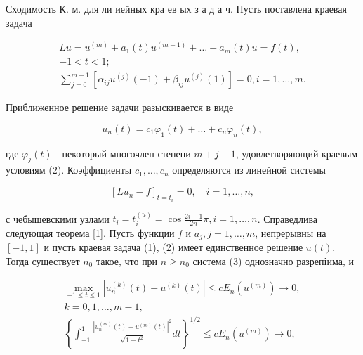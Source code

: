 \documentclass[10pt]{article}
\begin{document}
Сходимость К. м. для ли иейных кра ев ых з а д а ч. Пусть поставлена краевая задача



\[

\begin{gathered}

L u=u^{(m)}+a_{1}(t) u^{(m-1)}+\ldots+a_{m}(t) u=f(t), \\

-1<t<1 ; \\

\sum_{j=0}^{m-1}\left[\alpha_{i j} u^{(j)}(-1)+\beta_{i j} u^{(j)}(1)\right]=0, i=1, \ldots, m .

\end{gathered}

\]



Приближенное решение задачи разыскивается в виде



\[

u_{n}(t)=c_{1} \varphi_{1}(t)+\ldots+c_{n} \varphi_{n}(t),

\]



где $\varphi_{j}(t)$ - некоторый многочлен степени $m+j-1$, удовлетворяющий краевым условиям (2). Коэффициенты $c_{1}, \ldots, c_{n}$ определяются из линейной системы



\[

\left[L u_{n}-f\right]_{t=t_{i}}=0, \quad i=1, \ldots, n,

\]



с чебышевскими узлами $t_{i}=t_{i}^{(u)}=\cos \frac{2 i-1}{2 n} \pi, i=1, \ldots, n$. Справедлива следующая теорема [1]. Пусть функции $f$ и $a_{j}, j=1, \ldots, m$, непрерывны на $[-1,1]$ и пусть краевая задача (1), (2) имеет единственное решение $u(t)$. Тогда существует $n_{0}$ такое, что при $n \geqslant n_{0}$ система (3) однозначно разрепіима, и



\[

\begin{gathered}

\max _{-1 \leqslant t \leqslant 1}\left|u_{n}^{(k)}(t)-u^{(k)}(t)\right| \leqslant c E_{n}\left(u^{(m)}\right) \rightarrow 0, \\

k=0,1, \ldots, m-1, \\

\left\{\int_{-1}^{1} \frac{\left|u_{n}^{(m)}(t)-u^{(m)}(t)\right|^{2}}{\sqrt{1-t^{2}}} d t\right\}^{1 / 2} \leqslant c E_{n}\left(u^{(m)}\right) \rightarrow 0,

\end{gathered}

\]
\end{document}
